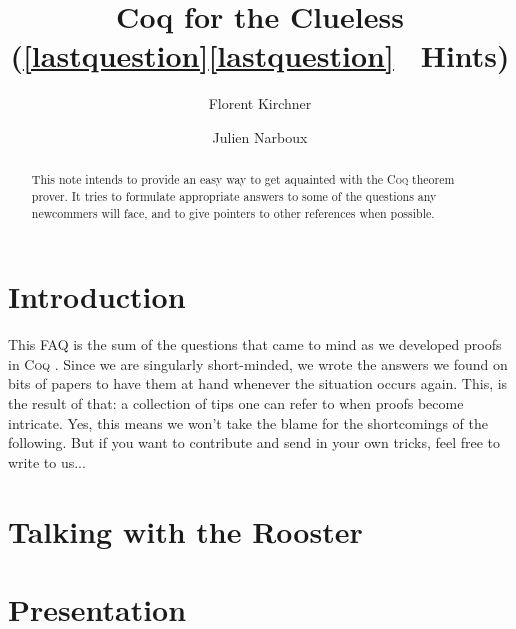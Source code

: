 \documentclass[a4paper]{faq}
\def\Coq{\textsc{Coq }}
\begin{document}



\title{Coq for the Clueless\\
  \large(\ifpdf\ref*{lastquestion}\else\protect\ref{lastquestion}\fi
  \ Hints)
}
\author{Florent Kirchner \and Julien Narboux}
\maketitle


\begin{abstract}
This note intends to provide an easy way to get aquainted with the
\Coq theorem prover. It tries to formulate appropriate answers
to some of the questions any newcommers will face, and to give
pointers to other references when possible.
\end{abstract}


\begin{multicols}{2}
\tableofcontents
\end{multicols}


\newpage
\section{Introduction}
This FAQ is the sum of the questions that came to mind as we developed
proofs in \Coq. Since we are singularly short-minded, we wrote the
answers we found on bits of papers to have them at hand whenever the
situation occurs again. This, is the result of that: a collection of
tips one can refer to when proofs become intricate. Yes, this means we
won't take the blame for the shortcomings of the following. But if you
want to contribute and send in your own tricks, feel free to write to
us...

\section{Talking with the Rooster}				     %
\label{core}							     %

\section{Presentation}
\end{document}
